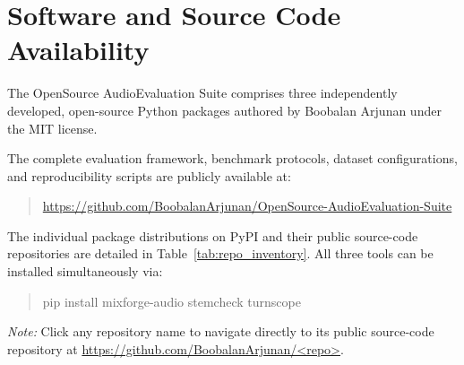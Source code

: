 \documentclass[10pt,journal,compsoc]{IEEEtran}
\begin{document}
\section{Software and Source Code Availability}
The OpenSource AudioEvaluation Suite comprises three independently developed, open-source Python packages authored by Boobalan Arjunan under the MIT license.

The complete evaluation framework, benchmark protocols, dataset configurations, and reproducibility scripts are publicly available at:
\begin{quote}
\centering
\url{https://github.com/BoobalanArjunan/OpenSource-AudioEvaluation-Suite}
\end{quote}

The individual package distributions on PyPI and their public source-code repositories are detailed in Table~\ref{tab:repo_inventory}. All three tools can be installed simultaneously via:
\begin{quote}
\footnotesize\ttfamily
pip install mixforge-audio stemcheck turnscope
\end{quote}

\begin{table}[t]
\centering
\caption{Public PyPI Distributions and GitHub Source Repositories.}
\label{tab:repo_inventory}
\footnotesize
\renewcommand{\arraystretch}{1.18}
\vspace{1mm}
\begin{minipage}{\columnwidth}
\scriptsize \textit{Note:} Click any repository name to navigate directly to its public source-code repository at \url{https://github.com/BoobalanArjunan/<repo>}.
\end{minipage}
\end{table}
\end{document}
